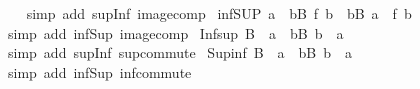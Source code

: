 \begin{isabellebody}
%
\isadelimproof
\ \ %
\endisadelimproof
%
\isatagproof
{}\isamarkupfalse%
\ {\isacharparenleft}{\kern0pt}simp\ add{\isacharcolon}{\kern0pt}\ sup{\isacharunderscore}{\kern0pt}Inf\ image{\isacharunderscore}{\kern0pt}comp{\isacharparenright}{\kern0pt}%
\endisatagproof
{\isafoldproof}%
%
\isadelimproof
\isanewline
%
\endisadelimproof
\isanewline
{}\isamarkupfalse%
\ inf{\isacharunderscore}{\kern0pt}SUP{\isacharcolon}{\kern0pt}\ {\isachardoublequoteopen}a\ {\isasymsqinter}\ {\isacharparenleft}{\kern0pt}{\isasymSqunion}b{\isasymin}B{\isachardot}{\kern0pt}\ f\ b{\isacharparenright}{\kern0pt}\ {\isacharequal}{\kern0pt}\ {\isacharparenleft}{\kern0pt}{\isasymSqunion}b{\isasymin}B{\isachardot}{\kern0pt}\ a\ {\isasymsqinter}\ f\ b{\isacharparenright}{\kern0pt}{\isachardoublequoteclose}\isanewline
%
\isadelimproof
\ \ %
\endisadelimproof
%
\isatagproof
{}\isamarkupfalse%
\ {\isacharparenleft}{\kern0pt}simp\ add{\isacharcolon}{\kern0pt}\ inf{\isacharunderscore}{\kern0pt}Sup\ image{\isacharunderscore}{\kern0pt}comp{\isacharparenright}{\kern0pt}%
\endisatagproof
{\isafoldproof}%
%
\isadelimproof
\isanewline
%
\endisadelimproof
\isanewline
{}\isamarkupfalse%
\ Inf{\isacharunderscore}{\kern0pt}sup{\isacharcolon}{\kern0pt}\ {\isachardoublequoteopen}{\isasymSqinter}B\ {\isasymsqunion}\ a\ {\isacharequal}{\kern0pt}\ {\isacharparenleft}{\kern0pt}{\isasymSqinter}b{\isasymin}B{\isachardot}{\kern0pt}\ b\ {\isasymsqunion}\ a{\isacharparenright}{\kern0pt}{\isachardoublequoteclose}\isanewline
%
\isadelimproof
\ \ %
\endisadelimproof
%
\isatagproof
{}\isamarkupfalse%
\ {\isacharparenleft}{\kern0pt}simp\ add{\isacharcolon}{\kern0pt}\ sup{\isacharunderscore}{\kern0pt}Inf\ sup{\isacharunderscore}{\kern0pt}commute{\isacharparenright}{\kern0pt}%
\endisatagproof
{\isafoldproof}%
%
\isadelimproof
\isanewline
%
\endisadelimproof
\isanewline
{}\isamarkupfalse%
\ Sup{\isacharunderscore}{\kern0pt}inf{\isacharcolon}{\kern0pt}\ {\isachardoublequoteopen}{\isasymSqunion}B\ {\isasymsqinter}\ a\ {\isacharequal}{\kern0pt}\ {\isacharparenleft}{\kern0pt}{\isasymSqunion}b{\isasymin}B{\isachardot}{\kern0pt}\ b\ {\isasymsqinter}\ a{\isacharparenright}{\kern0pt}{\isachardoublequoteclose}\isanewline
%
\isadelimproof
\ \ %
\endisadelimproof
%
\isatagproof
{}\isamarkupfalse%
\ {\isacharparenleft}{\kern0pt}simp\ add{\isacharcolon}{\kern0pt}\ inf{\isacharunderscore}{\kern0pt}Sup\ inf{\isacharunderscore}{\kern0pt}commute{\isacharparenright}{\kern0pt}%
\endisatagproof
{\isafoldproof}%
%
\isadelimproof
\isanewline

\end{isabellebody}
